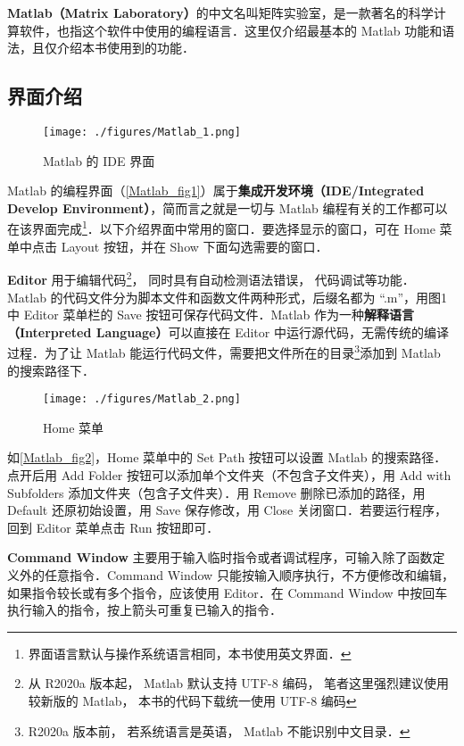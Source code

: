 
\textbf{Matlab（Matrix Laboratory）}的中文名叫矩阵实验室，是一款著名的科学计算软件，也指这个软件中使用的编程语言．这里仅介绍最基本的 Matlab 功能和语法，且仅介绍本书使用到的功能．


\subsection{界面介绍}

\begin{figure}[ht]
\centering
\texttt{[image: ./figures/Matlab\_1.png]}
\caption{Matlab 的 IDE 界面}\label{Matlab_fig1}
\end{figure}

Matlab 的编程界面（\autoref{Matlab_fig1}）属于\textbf{集成开发环境（IDE/Integrated Develop Environment）}，简而言之就是一切与 Matlab 编程有关的工作都可以在该界面完成\footnote{界面语言默认与操作系统语言相同，本书使用英文界面．}．以下介绍界面中常用的窗口．要选择显示的窗口，可在 Home 菜单中点击 Layout 按钮，并在 Show 下面勾选需要的窗口．

\textbf{Editor} 用于编辑代码\footnote{从 R2020a 版本起， Matlab 默认支持 UTF-8 编码， 笔者这里强烈建议使用较新版的 Matlab， 本书的代码下载统一使用 UTF-8 编码}， 同时具有自动检测语法错误， 代码调试等功能． Matlab 的代码文件分为脚本文件和函数文件两种形式，后缀名都为 “.m”，用图1中 Editor 菜单栏的 Save 按钮可保存代码文件．Matlab 作为一种\textbf{解释语言（Interpreted Language）}可以直接在 Editor 中运行源代码，无需传统的编译过程．为了让 Matlab 能运行代码文件，需要把文件所在的目录\footnote{R2020a 版本前， 若系统语言是英语， Matlab 不能识别中文目录．}添加到 Matlab 的搜索路径下．

\begin{figure}[ht]
\centering
\texttt{[image: ./figures/Matlab\_2.png]}
\caption{Home 菜单}\label{Matlab_fig2}
\end{figure}

如\autoref{Matlab_fig2}，Home 菜单中的 Set Path 按钮可以设置 Matlab 的搜索路径．点开后用 Add Folder 按钮可以添加单个文件夹（不包含子文件夹），用 Add with Subfolders 添加文件夹（包含子文件夹）．用 Remove 删除已添加的路径，用 Default 还原初始设置，用 Save 保存修改，用 Close 关闭窗口．若要运行程序，回到 Editor 菜单点击 Run 按钮即可．

\textbf{Command Window} 主要用于输入临时指令或者调试程序，可输入除了函数定义外的任意指令．Command Window 只能按输入顺序执行，不方便修改和编辑，如果指令较长或有多个指令，应该使用 Editor．在 Command Window 中按回车执行输入的指令，按上箭头可重复已输入的指令．

